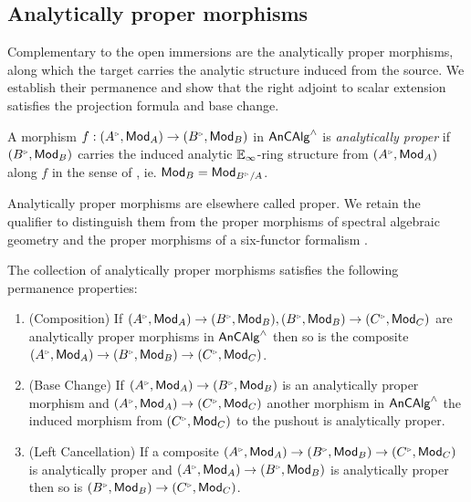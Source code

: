 \subsection{Analytically proper morphisms}\label{subsec: analytically proper morphisms}
Complementary to the open immersions are the analytically proper morphisms, along which the target carries the analytic structure induced from the source. We establish their permanence and show that the right adjoint to scalar extension satisfies the projection formula and base change.
\begin{definition}\label{def: analytically proper}
    A morphism $f:(A^{\tri},\Mod_{A})\to(B^{\tri},\Mod_{B})$ in $\mathsf{An}\mathsf{CAlg}^{\wedge}$ is \emph{analytically proper} if $(B^{\tri},\Mod_{B})$ carries the induced analytic $\mathbb{E}_{\infty}$-ring structure from $(A^{\tri},\Mod_{A})$ along $f$ in the sense of , ie. $\Mod_{B}=\Mod_{B^{\tri}/A}$.
\end{definition}
\begin{remark}\label{rmk: analytically proper naming}
    Analytically proper morphisms are elsewhere called proper. We retain the qualifier to distinguish them from the proper morphisms of spectral algebraic geometry \cite[Def. 5.1.2.1]{SAG} and the proper morphisms of a six-functor formalism \cite[Def. 4.6.1]{HeyerMann6FF}.
\end{remark}
\begin{proposition}\label{prop: permanence of analytically proper}
    The collection of analytically proper morphisms satisfies the following permanence properties: 
    \begin{enumerate}
        \item (Composition) If $(A^{\tri},\Mod_{A})\to (B^{\tri},\Mod_{B}), (B^{\tri},\Mod_{B})\to (C^{\tri},\Mod_{C})$ are analytically proper morphisms in $\mathsf{An}\mathsf{CAlg}^{\wedge}$ then so is the composite $(A^{\tri},\Mod_{A})\to (B^{\tri},\Mod_{B})\to (C^{\tri},\Mod_{C})$. 
        \item (Base Change) If $(A^{\tri},\Mod_{A})\to (B^{\tri},\Mod_{B})$ is an analytically proper morphism and $(A^{\tri},\Mod_{A})\to (C^{\tri},\Mod_{C})$ another morphism in $\mathsf{An}\mathsf{CAlg}^{\wedge}$ the induced morphism from $(C^{\tri},\Mod_{C})$ to the pushout is analytically proper.
        \item (Left Cancellation) If a composite $(A^{\tri},\Mod_{A})\to (B^{\tri},\Mod_{B})\to (C^{\tri},\Mod_{C})$ is analytically proper and $(A^{\tri},\Mod_{A})\to (B^{\tri},\Mod_{B})$ is analytically proper then so is $(B^{\tri},\Mod_{B})\to (C^{\tri},\Mod_{C})$. 
    \end{enumerate}
\end{proposition}
